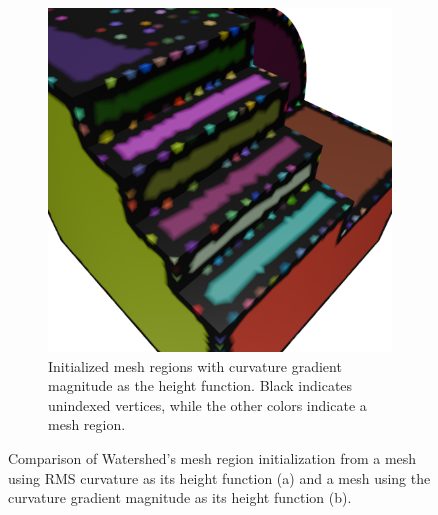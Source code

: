 \begin{figure}[htb]
\begin{subfigure}[t]{0.42\textwidth}
		\includegraphics[width=\linewidth]{../resources/curvature/m7120369_gradk_init.png}
		\caption{%
Initialized mesh regions with curvature gradient magnitude as the height function.
Black indicates unindexed vertices, while the other colors indicate a mesh region.
}
		\label{sfig:m7_gradk_init}
	\end{subfigure}
	\caption{Comparison of Watershed's mesh region initialization from a mesh using RMS curvature as its height function (a) and a mesh using the curvature gradient magnitude as its height function (b).}
\end{figure}

